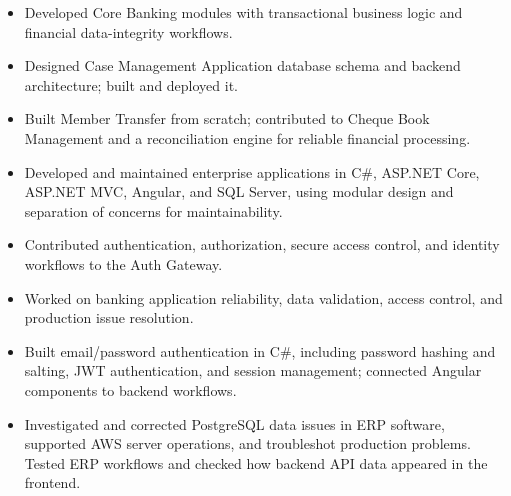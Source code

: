 \newcommand{\BankCase}{Designed Case Management Application database schema and backend architecture; built and deployed it.}
\newcommand{\BankCore}{Developed Core Banking modules with transactional business logic and financial data-integrity workflows.}
\newcommand{\BankModules}{Built Member Transfer from scratch; contributed to Cheque Book Management and a reconciliation engine for reliable financial processing.}
\newcommand{\BankStack}{Developed and maintained enterprise applications in C\#, ASP.NET Core, ASP.NET MVC, Angular, and SQL Server, using modular design and separation of concerns for maintainability.}
\newcommand{\BankAuth}{Contributed authentication, authorization, secure access control, and identity workflows to the Auth Gateway.}
\newcommand{\BankReliability}{Worked on banking application reliability, data validation, access control, and production issue resolution.}
\begin{itemize}
  \item \BankCore
  \item \BankCase
  \item \BankModules
  \item \BankStack
  \item \BankAuth
  \item \BankReliability
\end{itemize}

\begin{itemize}
  \item Built email/password authentication in C\#, including password hashing and salting, JWT authentication, and session management; connected Angular components to backend workflows.
\end{itemize}
\EntryGap
{}
\begin{itemize}
  \item Investigated and corrected PostgreSQL data issues in ERP software, supported AWS server operations, and troubleshot production problems. Tested ERP workflows and checked how backend API data appeared in the frontend.
\end{itemize}
